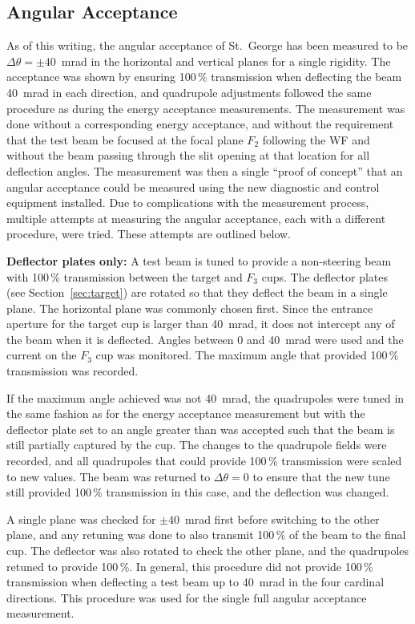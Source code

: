 \subsection{Angular Acceptance}

As of this writing, the angular acceptance of St.\ George has been
measured to be $\Delta\theta = \pm 40$~mrad in the horizontal and
vertical planes for a single rigidity. The acceptance was shown by
ensuring 100\,\% transmission when deflecting the beam 40~mrad in each
direction, and quadrupole adjustments followed the same procedure as
during the energy acceptance measurements. The measurement was done
without a corresponding energy acceptance, and without the requirement
that the test beam be focused at the focal plane $F_2$ following the WF
and without the beam passing through the slit opening at that location
for all deflection angles. The measurement was then a single ``proof of
concept'' that an angular acceptance could be measured using the new
diagnostic and control equipment installed. Due to complications with
the measurement process, multiple attempts at measuring the angular
acceptance, each with a different procedure, were tried. These attempts
are outlined below.

\textbf{Deflector plates only:}
A test beam is tuned to provide a non-steering beam with 100\,\%
transmission between the target and $F_3$ cups. The deflector plates
(see Section~\ref{sec:target}) are rotated so that they deflect the beam
in a single plane. The horizontal plane was commonly chosen first. Since
the entrance aperture for the target cup is larger than 40~mrad, it does
not intercept any of the beam when it is deflected. Angles between 0 and
40~mrad were used and the current on the $F_3$ cup was monitored. The
maximum angle that provided 100\,\% transmission was recorded.

If the maximum angle achieved was not 40~mrad, the quadrupoles were
tuned in the same fashion as for the energy acceptance measurement but
with the deflector plate set to an angle greater than was accepted such
that the beam is still partially captured by the cup. The changes to the
quadrupole fields were recorded, and all quadrupoles that could provide
100\,\% transmission were scaled to new values. The beam was returned to
$\Delta\theta = 0$ to ensure that the new tune still provided 100\,\%
transmission in this case, and the deflection was changed.

A single plane was checked for $\pm 40$~mrad first before switching to
the other plane, and any retuning was done to also transmit 100\,\% of
the beam to the final cup. The deflector was also rotated to check the
other plane, and the quadrupoles retuned to provide 100\,\%. In general,
this procedure did not provide 100\,\% transmission when deflecting a
test beam up to 40~mrad in the four cardinal directions. This procedure
was used for the single full angular acceptance measurement.

